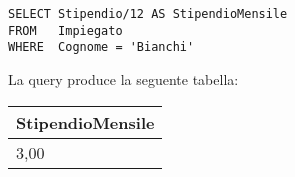 \begin{lstlisting}
SELECT Stipendio/12 AS StipendioMensile
FROM   Impiegato
WHERE  Cognome = 'Bianchi'
\end{lstlisting}

La query produce la seguente tabella:

\begin{center}
	\begin{tabular}{@{} l @{}}
		\toprule
			StipendioMensile \\
		\midrule
			3,00 \\
		\bottomrule
	\end{tabular}
\end{center}
